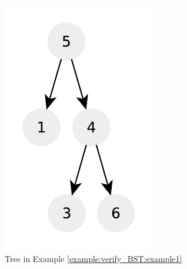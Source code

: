 \begin{figure}
	\vspace*{-0.5in}
	\centering
	\begin{subfigure}[t]{0.30\textwidth}
		\includegraphics[width=1\linewidth]{sources/verify_BST/images/example1}
		\caption[]{Tree in Example \ref{example:verify_BST:example1}}
		\label{fig:verify:example1}
	 \end{subfigure}
	\hfill
	\begin{subfigure}[t]{0.30\textwidth}

\end{subfigure}
\end{figure}
